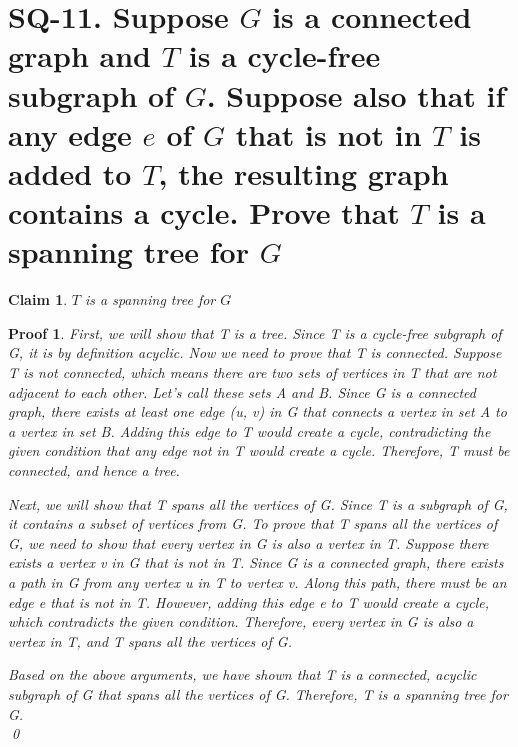 \documentclass{article}
\newtheorem*{claim}{Claim}
\newtheorem*{poof}{Proof}
\begin{document}
\section*{SQ-11. Suppose $G$ is a connected graph and $T$ is a cycle-free subgraph of $G$. Suppose also that if any edge $e$ of $G$ that is not in $T$ is added to $T$, the resulting graph contains a cycle. Prove that $T$ is a spanning tree for $G$}
\begin{claim}
    $T$ is a spanning tree for $G$
\end{claim}
\begin{poof}
    First, we will show that T is a tree. Since T is a cycle-free subgraph of G, it is by definition acyclic. Now we need to prove that T is connected. Suppose T is not connected, which means there are two sets of vertices in T that are not adjacent to each other. Let's call these sets A and B. Since G is a connected graph, there exists at least one edge (u, v) in G that connects a vertex in set A to a vertex in set B. Adding this edge to T would create a cycle, contradicting the given condition that any edge not in T would create a cycle. Therefore, T must be connected, and hence a tree.

    Next, we will show that T spans all the vertices of G. Since T is a subgraph of G, it contains a subset of vertices from G. To prove that T spans all the vertices of G, we need to show that every vertex in G is also a vertex in T. Suppose there exists a vertex v in G that is not in T. Since G is a connected graph, there exists a path in G from any vertex u in T to vertex v. Along this path, there must be an edge e that is not in T. However, adding this edge e to T would create a cycle, which contradicts the given condition. Therefore, every vertex in G is also a vertex in T, and T spans all the vertices of G.
    
    Based on the above arguments, we have shown that T is a connected, acyclic subgraph of G that spans all the vertices of G. Therefore, T is a spanning tree for G.\\
\qed\end{poof}
\end{document}
